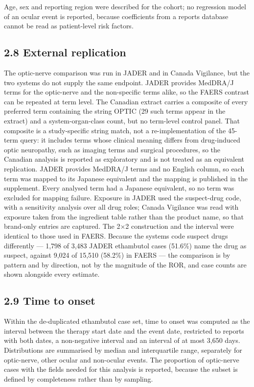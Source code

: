 \documentclass[12pt,a4paper]{article}
\begin{document}
Age, sex and reporting region were described for the cohort; no regression model of an ocular event is reported, because coefficients from a reports database cannot be read as patient-level risk factors.

\subsection*{2.8 External replication}

The optic-nerve comparison was run in JADER and in Canada Vigilance, but the two systems do not supply the same endpoint. JADER provides MedDRA/J terms for the optic-nerve and the non-specific terms alike, so the FAERS contrast can be repeated at term level. The Canadian extract carries a composite of every preferred term containing the string OPTIC (29 such terms appear in the extract) and a system-organ-class count, but no term-level control panel. That composite is a study-specific string match, not a re-implementation of the 45-term query: it includes terms whose clinical meaning differs from drug-induced optic neuropathy, such as imaging terms and surgical procedures, so the Canadian analysis is reported as exploratory and is not treated as an equivalent replication. JADER provides MedDRA/J terms and no English column, so each term was mapped to its Japanese equivalent and the mapping is published in the supplement. Every analysed term had a Japanese equivalent, so no term was excluded for mapping failure. Exposure in JADER used the suspect-drug code, with a sensitivity analysis over all drug roles; Canada Vigilance was read with exposure taken from the ingredient table rather than the product name, so that brand-only entries are captured. The 2×2 construction and the interval were identical to those used in FAERS. Because the systems code suspect drugs differently — 1,798 of 3,483 JADER ethambutol cases (51.6\%) name the drug as suspect, against 9,024 of 15,510 (58.2\%) in FAERS — the comparison is by pattern and by direction, not by the magnitude of the ROR, and case counts are shown alongside every estimate.

\subsection*{2.9 Time to onset}

Within the de-duplicated ethambutol case set, time to onset was computed as the interval between the therapy start date and the event date, restricted to reports with both dates, a non-negative interval and an interval of at most 3,650 days. Distributions are summarised by median and interquartile range, separately for optic-nerve, other ocular and non-ocular events. The proportion of optic-nerve cases with the fields needed for this analysis is reported, because the subset is defined by completeness rather than by sampling.
\end{document}
